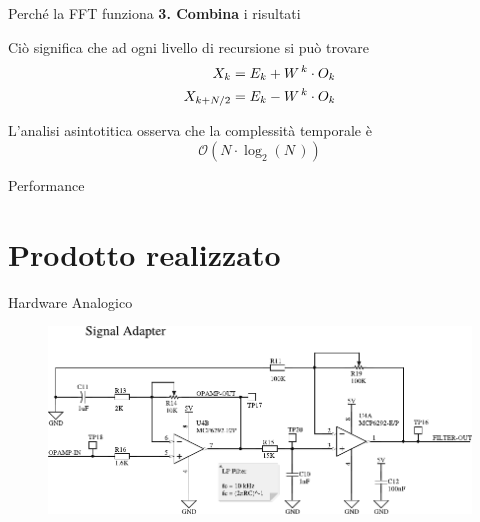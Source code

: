 \documentclass[10pt, xetex]{beamer}
\begin{document}
\begin{frame}{Perch\'e la FFT funziona}
    \textbf{\LARGE 3. Combina}
    {\color{gray} i risultati}
    \vfill

    Ci\`o significa che ad ogni livello di recursione si pu\`o trovare
    \begin{align*} \large
        X_k &= E_k + W^{\,k}\cdot O_k \\
        X_{k+N/2} &= E_k - W^{\,k}\cdot O_k
    \end{align*}

    L'analisi asintotitica osserva che la complessit\`a temporale \`e
    {\large \[\mathcal{O}(N\cdot\log_2(N\,))\]}
\end{frame}

\begin{frame}{Performance}
    \begin{figure}
    \end{figure}
\end{frame}

\section{Prodotto realizzato}
\begin{frame}{Hardware Analogico}
    \begin{figure}
        \includegraphics[width=\linewidth]{figures/circuits/filter-ampl-v2}
    \end{figure}
\end{frame}
\end{document}
